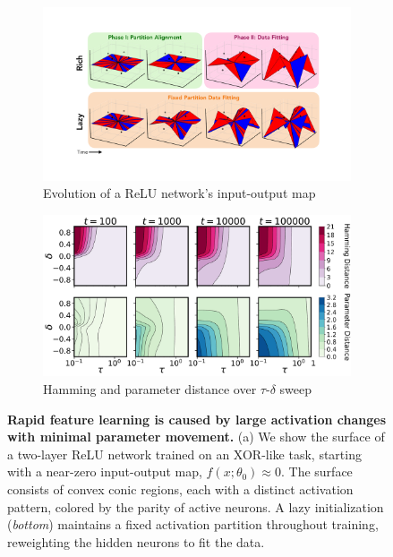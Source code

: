\documentclass{article}
\theoremstyle{plain}
\theoremstyle{definition}
\theoremstyle{remark}
\begin{document}
\begin{figure}[t]
    \vspace{-15pt}
    \centering
    \begin{subfigure}{0.49\linewidth}
        \centering
        \includegraphics[width=\linewidth]{fig/ReLU-surface/fig5.pdf}
        \caption{Evolution of a ReLU network's input-output map}
    \end{subfigure}
    \begin{subfigure}{0.49\linewidth}
        \centering
        \includegraphics[width=\linewidth]{fig/two-layer/hamming-parameter.pdf}
        \caption{Hamming and parameter distance over $\tau$-$\delta$ sweep}
    \end{subfigure}
    \caption{
    \textbf{Rapid feature learning is caused by large activation changes with minimal parameter movement.}
    (a) We show the surface of a two-layer ReLU network trained on an XOR-like task, starting with a near-zero input-output map, $f(x;\theta_0)\approx0$. 
    The surface consists of convex conic regions, each with a distinct activation pattern, colored by the parity of active neurons. 
    A lazy initialization (\textit{bottom}) maintains a fixed activation partition throughout training, reweighting the hidden neurons to fit the data.
}
\end{figure}
\end{document}
